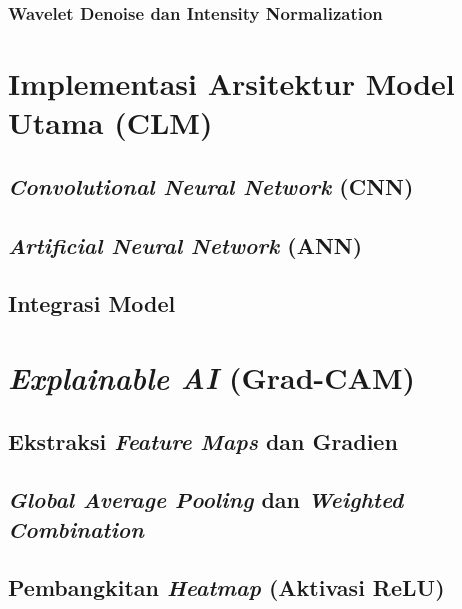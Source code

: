 \subsubsection{Wavelet Denoise dan Intensity Normalization}


\section{Implementasi Arsitektur Model Utama (CLM)}

\subsection{\textit{Convolutional Neural Network} (CNN)}

\subsection{\textit{Artificial Neural Network} (ANN)}

\subsection{Integrasi Model}

\section{\textit{Explainable AI} (Grad-CAM)}

\subsection{Ekstraksi \textit{Feature Maps} dan Gradien}

\subsection{\textit{Global Average Pooling} dan \textit{Weighted Combination}}

\subsection{Pembangkitan \textit{Heatmap} (Aktivasi ReLU)}